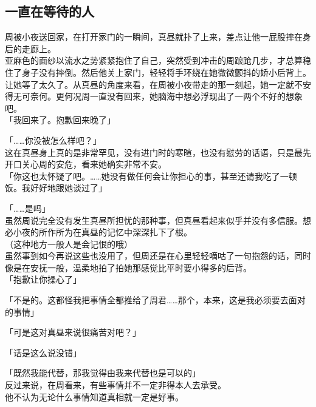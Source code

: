 \subsection{一直在等待的人}

周被小夜送回家，在打开家门的一瞬间，真昼就扑了上来，差点让他一屁股摔在身后的走廊上。\\

亚麻色的面纱以流水之势紧紧抱住了自己，突然受到冲击的周踉跄几步，才总算稳住了身子没有摔倒。然后他关上家门，轻轻将手环绕在她微微颤抖的娇小后背上。\\

让她等了太久了。从真昼的角度来看，在周被小夜带走的那一刻起，她一定就不安得无可奈何。更何况周一直没有回来，她脑海中想必浮现出了一两个不好的想象吧。\\

「我回来了。抱歉回来晚了」

「……你没被怎么样吧？」\\

这在真昼身上真的是非常罕见，没有进门时的寒暄，也没有慰劳的话语，只是最先开口关心周的安危，看来她确实非常不安。\\

「你这也太怀疑了吧。……她没有做任何会让你担心的事，甚至还请我吃了一顿饭。我好好地跟她谈过了」

「……是吗」\\

虽然周说完全没有发生真昼所担忧的那种事，但真昼看起来似乎并没有多信服。想必小夜的所作所为在真昼的记忆中深深扎下了根。\\

（这种地方一般人是会记恨的哦）\\

虽然事到如今再说这些也没用了，但周还是在心里轻轻嘀咕了一句抱怨的话，同时像是在安抚一般，温柔地拍了拍她那感觉比平时要小得多的后背。\\

「抱歉让你操心了」

「不是的。这都怪我把事情全都推给了周君……那个，本来，这是我必须要去面对的事情」

「可是这对真昼来说很痛苦对吧？」

「话是这么说没错」

「既然我能代替，那我觉得由我来代替也是可以的」\\

反过来说，在周看来，有些事情并不一定非得本人去承受。\\

他不认为无论什么事情知道真相就一定是好事。\\

